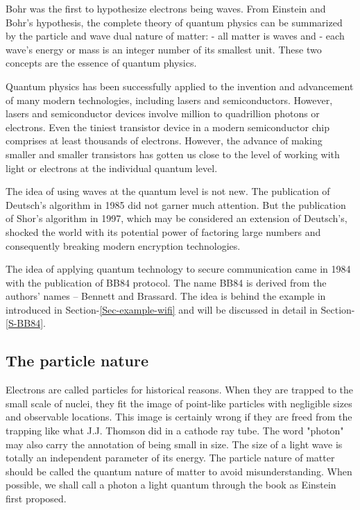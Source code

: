 \documentclass[oneside, letter, 12pt]{book}
\begin{document}
Bohr was the first to hypothesize electrons being waves. From Einstein and Bohr's hypothesis, the complete theory of quantum physics can be summarized by the particle and wave dual nature of matter:
- all matter is waves and
- each wave's energy or mass is an integer number of its smallest unit.
These two concepts are the essence of quantum physics.

Quantum physics has been successfully applied to the invention and advancement of many modern technologies, including lasers and semiconductors. However, lasers and semiconductor devices involve million to quadrillion photons or electrons. Even the tiniest transistor device in a modern semiconductor chip comprises at least thousands of electrons. However, the advance of making smaller and smaller transistors has gotten us close to the level of working with light or electrons at the individual quantum level.

The idea of using waves at the quantum level is not new. The publication of Deutsch's algorithm\cite{1985Deutsch} in 1985 did not garner much attention. But the publication of Shor's algorithm in 1997, which may be considered an extension of Deutsch's, shocked the world with its potential power of factoring large numbers and consequently breaking modern encryption technologies.

The idea of applying quantum technology to secure communication came in 1984 with the publication of BB84 protocol\cite{1997Shor}. The name BB84 is derived from the authors' names -- Bennett and Brassard. The idea is behind the example in introduced in Section-\ref{Sec-example-wifi} and will be discussed in detail in Section-\ref{S-BB84}.

\subsection{The particle nature}
Electrons are called particles for historical reasons. When they are trapped to the small scale of nuclei, they fit the image of point-like particles with negligible sizes and observable locations. This image is certainly wrong if they are freed from the trapping like what J.J. Thomson did in a cathode ray tube. The word "photon" may also carry the annotation of being small in size. The size of a light wave is totally an independent parameter of its energy. The particle nature of matter should be called the quantum nature of matter to avoid misunderstanding. When possible, we shall call a photon a light quantum through the book as Einstein first proposed.
\end{document}
